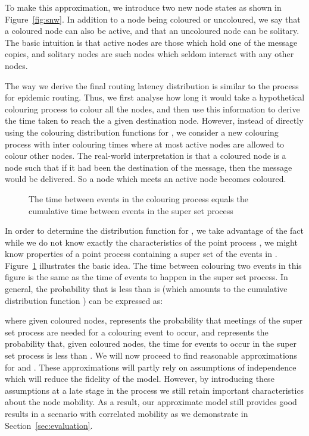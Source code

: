 \documentclass{article}
\begin{document}
To make this approximation, we introduce two new node states as shown in
Figure~\ref{fig:snw}. In addition to a node being coloured or
uncoloured, we say that a coloured node can also be active, and that
an uncoloured node can be solitary. The basic intuition is that active
nodes are those which hold one of the message copies, and solitary
nodes are such nodes which seldom interact with any other nodes. 

The way we derive the final routing latency distribution is similar to
the process for epidemic routing. Thus, we first analyse how long it
would take a hypothetical colouring process to colour all the nodes,
and then use this information to derive the time taken to reach the a
given destination node. However, instead of directly using the
colouring distribution functions for , we consider a new
colouring process  with inter colouring times 
where at most  active nodes are allowed to colour other nodes. The
real-world interpretation is that a coloured node is a node such that
if it had been the destination of the message, then the message would
be delivered. So a node which meets an active node becomes coloured.

\begin{figure}[ht]
  \centering
  \caption{The time between events in the colouring process  equals the cumulative time between  events in the super set process   }
  \label{fig:multicopy}
\end{figure}

In order to determine the distribution function for , we
take advantage of the fact while we do not know exactly the
characteristics of the point process , we might know
properties of a point process containing a super set of the events in
. Figure~\ref{fig:multicopy} illustrates the basic
idea. The time between colouring two events in this figure is the same 
as the time of  events to happen in the super set process. In
general, the probability that  is less than  is (which
amounts to the cumulative distribution function )
can be expressed as:


where given  coloured nodes,  represents the probability
that  meetings of the super set process are needed for a colouring
event to occur, and  represents the probability that, given
 coloured nodes, the time for  events to occur in the super set
process is less than . We will now proceed to find reasonable
approximations for  and . These approximations will
partly rely on assumptions of independence which will reduce the
fidelity of the model. However, by introducing these assumptions at a
late stage in the process we still retain important characteristics
about the node mobility. As a result, our approximate model still
provides good results in a scenario with correlated mobility as we
demonstrate in Section~\ref{sec:evaluation}.
\end{document}
